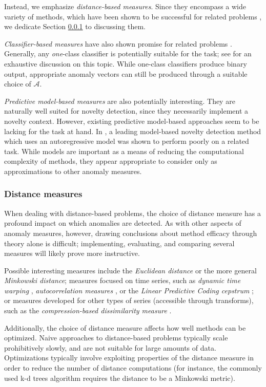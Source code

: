 Instead, we emphasize \emph{distance-based measures}. Since they encompass a wide variety of methods, which have been shown to be successful for related problems \cite{chandola3}, we dedicate Section \ref{sect:distance_mezurez} to discussing them.

\emph{Classifier-based measures} have also shown promise for related problems \cite{chandola3}. Generally, any \emph{one}-class classifier is potentially suitable for the task; see \cite{classification} for an exhaustive discussion on this topic. While one-class classifiers produce binary output, appropriate anomaly vectors can still be produced through a suitable choice of $\mathcal{A}$.

\emph{Predictive model-based measures} are also potentially interesting. They are naturally well suited for novelty detection, since they necessarily implement a novelty context. However, existing predictive model-based approaches seem to be lacking for the task at hand. In \cite{chandola3}, a leading model-based novelty detection method \cite{perkins2} which uses an autoregressive model was shown to perform poorly on a related task. While models are important as a means of reducing the computational complexity of methods, they appear appropriate to consider only as approximations to other anomaly measures.

\subsubsection{Distance measures}
\label{sect:distance_mezurez}

When dealing with distance-based problems, the choice of distance measure has a profound impact on which anomalies are detected. As with other aspects of anomaly measures, however, drawing conclusions about method efficacy through theory alone is difficult; implementing, evaluating, and comparing several measures will likely prove more instructive.

Possible interesting measures include the \emph{Euclidean distance} or the more general \emph{Minkowski distance}; measures focused on time series, such as \emph{dynamic time warping} \cite{dtw}, \emph{autocorrelation measures} \cite{autocorrelation}, or the \emph{Linear Predictive Coding cepstrum} \cite{cepstrum}; or measures developed for other types of series (accessible through transforms), such as the \emph{compression-based dissimilarity measure} \cite{keogh2}.

Additionally, the choice of distance measure affects how well methods can be optimized. Naive approaches to distance-based problems typically scale prohibitively slowly, and are not suitable for large amounts of data. Optimizations typically involve exploiting properties of the distance measure in order to reduce the number of distance computations (for instance, the commonly used k-d trees algorithm requires the distance to be a Minkowski metric).

